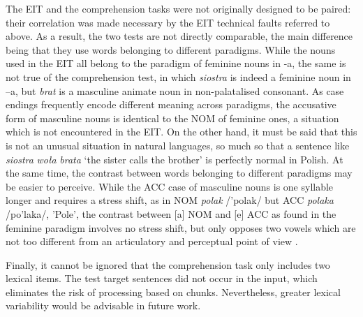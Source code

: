 The EIT and the comprehension tasks were not originally designed to be paired: their correlation was made necessary by the EIT technical faults referred to above. As a result, the two tests are not directly comparable, the main difference being that they use words belonging to different paradigms. While the nouns used in the EIT all belong to the paradigm of feminine nouns in -a, the same is not true of the comprehension test, in which \textit{siostra} is indeed a feminine noun in –a, but \textit{brat} is a masculine animate noun in non-palatalised consonant. As case endings frequently encode different meaning across paradigms, the accusative form of masculine nouns is identical to the NOM of feminine ones, a situation which is not encountered in the EIT. On the other hand, it must be said that this is not an unusual situation in natural languages, so much so that a sentence like \textit{siostra} \textit{woła} \textit{brata} ‘the sister calls the brother’ is perfectly normal in Polish. At the same time, the contrast between words belonging to different paradigms may be easier to perceive. While the ACC case of masculine nouns is one syllable longer and requires a stress shift, as in NOM \textit{polak} /'polak/ but ACC \textit{polaka} /po'laka/, 'Pole', the contrast between [a] NOM and [e] ACC as found in the feminine paradigm involves no stress shift, but only opposes two vowels which are not too different from an articulatory and perceptual point of view \citep{SisinniEtAl2013}.

Finally, it cannot be ignored that the comprehension task only includes two lexical items. The test target sentences did not occur in the input, which eliminates the risk of processing based on chunks. Nevertheless, greater lexical variability would be advisable in future work.
